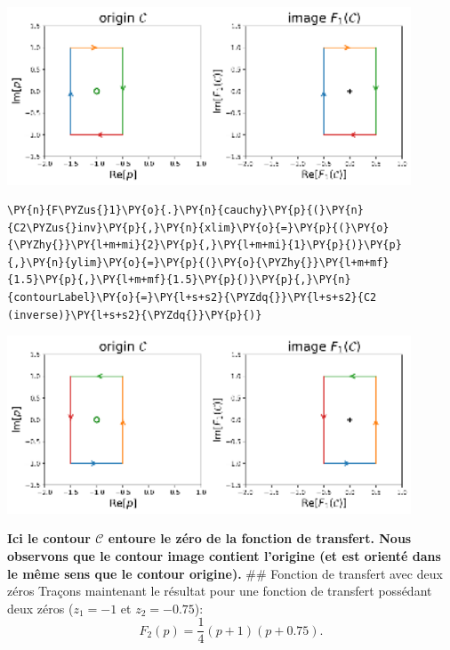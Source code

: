 \begin{center}
    \includegraphics[width=0.9\textwidth]{notebook/fig/output_20_1.eps}
\end{center}
\begin{tcolorbox}[breakable, size=fbox, boxrule=1pt, pad at break*=1mm,colback=cellbackground, colframe=cellborder]
\begin{Verbatim}[commandchars=\\\{\}]
\PY{n}{F\PYZus{}1}\PY{o}{.}\PY{n}{cauchy}\PY{p}{(}\PY{n}{C2\PYZus{}inv}\PY{p}{,}\PY{n}{xlim}\PY{o}{=}\PY{p}{(}\PY{o}{\PYZhy{}}\PY{l+m+mi}{2}\PY{p}{,}\PY{l+m+mi}{1}\PY{p}{)}\PY{p}{,}\PY{n}{ylim}\PY{o}{=}\PY{p}{(}\PY{o}{\PYZhy{}}\PY{l+m+mf}{1.5}\PY{p}{,}\PY{l+m+mf}{1.5}\PY{p}{)}\PY{p}{,}\PY{n}{contourLabel}\PY{o}{=}\PY{l+s+s2}{\PYZdq{}}\PY{l+s+s2}{C2 (inverse)}\PY{l+s+s2}{\PYZdq{}}\PY{p}{)}
\end{Verbatim}
\end{tcolorbox}
\begin{center}
    \includegraphics[width=0.9\textwidth]{notebook/fig/output_21_1.eps}
\end{center}
\textbf{Ici le contour \(\mathcal{C}\) entoure le zéro de la fonction de
transfert. Nous observons que le contour image contient l'origine (et
est orienté dans le même sens que le contour origine).} \#\# Fonction de
transfert avec deux zéros
Traçons maintenant le résultat pour une fonction de transfert possédant
deux zéros (\(z_1=-1\) et \(z_2=-0.75\)):
\[
F_2(p)=\dfrac{1}{4}(p+1)(p+0.75).
\]
